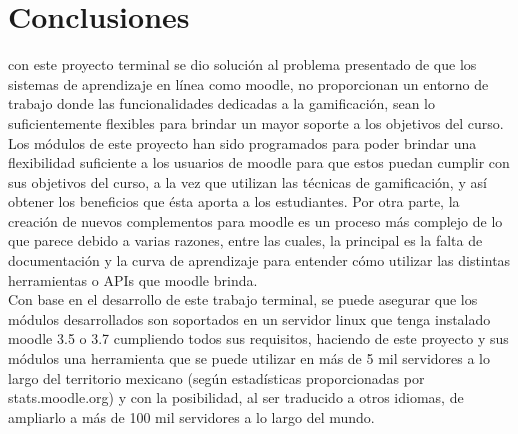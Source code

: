 
\section{Conclusiones}

\noindent con este proyecto terminal se dio solución al problema presentado de que los sistemas de aprendizaje en línea como moodle, no proporcionan un entorno de trabajo donde las funcionalidades dedicadas a la gamificación, sean lo suficientemente flexibles
para brindar un mayor soporte a los objetivos del curso. Los módulos de este proyecto han sido programados para poder brindar una flexibilidad suficiente a los usuarios de moodle para que estos puedan cumplir con sus objetivos del curso, a la vez que utilizan las técnicas de gamificación, y así obtener los beneficios que ésta aporta a los estudiantes.  Por otra parte, la creación de nuevos complementos para moodle es un proceso más complejo de lo que parece debido a varias razones, entre las cuales, la principal es la falta de documentación y la curva de aprendizaje para entender cómo utilizar las distintas herramientas o APIs que moodle brinda.\\

\noindent Con base en el desarrollo de este trabajo terminal, se puede asegurar que
los módulos desarrollados son soportados en un servidor linux que tenga instalado
moodle 3.5 o 3.7 cumpliendo todos sus requisitos, haciendo de este proyecto y sus
módulos una herramienta que se puede utilizar en más de 5 mil servidores a lo largo
del territorio mexicano (según estadísticas proporcionadas por stats.moodle.org) y con la posibilidad, al ser traducido a otros idiomas, de ampliarlo a más de 100 mil servidores a lo largo del mundo.

